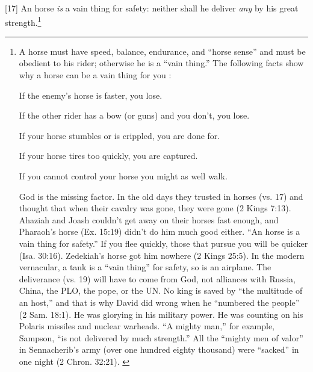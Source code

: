 [17] \textcolor[rgb]{0.00,0.00,1.00}{An horse \emph{is} a vain thing for safety: neither shall he deliver \emph{any} by his great strength.}\footnote{A horse must have speed, balance, endurance, and “horse sense” and must be obedient to his rider; otherwise he is a “vain thing.”
The following facts show why a horse can be a vain thing for you \cite{Ruckman1992Psalms}:
\begin{compactenum}
\item If the enemy’s horse is faster, you lose.
\item If the other rider has a bow (or guns) and you don’t, you lose.
\item If your horse stumbles or is crippled, you are done for.
\item If your horse tires too quickly, you are captured.
\item If you cannot control your horse you might as well walk. 
\end{compactenum}
God is the missing factor.
In the old days they trusted in horses (vs. 17) and thought that when their cavalry was gone, they were gone (2 Kings 7:13). Ahaziah and Joash couldn’t get away on their horses fast enough, and Pharaoh’s horse (Ex. 15:19) didn’t do him much good either. “An horse is a vain thing for safety.” If you flee quickly, those that pursue you will be quicker (Isa. 30:16). Zedekiah’s horse got him nowhere (2 Kings 25:5). In the modern vernacular, a tank is a “vain thing” for safety, so is an airplane. The deliverance (vs. 19) will have to come from God, not alliances with Russia, China, the PLO, the pope, or the UN. No king is saved by “the multitude of an host,” and that is why David did wrong when he “numbered the people” (2 Sam. 18:1). He was glorying in his military power. He was counting on his Polaris missiles and nuclear warheads. “A mighty man,” for example, Sampson, “is not delivered by much strength.” All the “mighty men of valor” in Sennacherib’s army (over one hundred eighty thousand) were “sacked” in one night (2 Chron. 32:21). \cite{Ruckman1992Psalms} }
